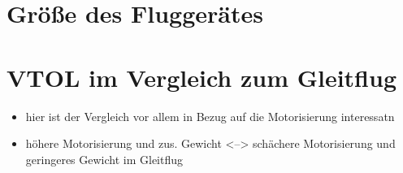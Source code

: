 \section{Größe des Fluggerätes}
\label{sec:groesse}

\section{VTOL im Vergleich zum Gleitflug}
\label{sec:vtol_vs_gleitflug}
\begin{itemize}
	\item hier ist der Vergleich vor allem in Bezug auf die Motorisierung interessatn
	\item höhere Motorisierung und zus. Gewicht <--> schächere Motorisierung und geringeres Gewicht im Gleitflug
\end{itemize}